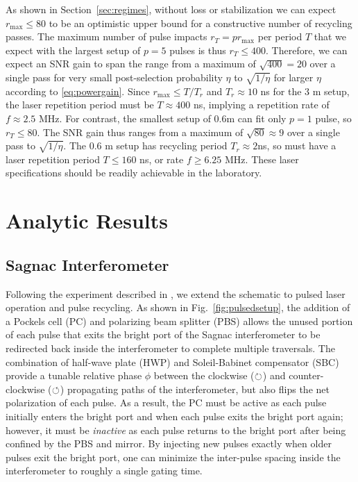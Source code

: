 As shown in Section~\ref{sec:regimes}, without loss or stabilization we can expect $r_{\text{max}} \leq 80$ to be an optimistic upper bound for a constructive number of recycling passes.  The maximum number of pulse impacts $r_T = p r_{\text{max}}$ per period $T$ that we expect with the largest setup of $p=5$ pulses is thus $r_T \leq 400$.  Therefore, we can expect an SNR gain to span the range from a maximum of $\sqrt{400}=20$ over a single pass for very small post-selection probability $\eta$ to $\sqrt{1/\eta}$ for larger $\eta$ according to \eqref{eq:powergain}.  Since $r_{\text{max}} \le T / T_r$ and $T_r \approx 10$ ns for the $3$ m setup, the laser repetition period must be $T \approx 400$ ns, implying a repetition rate of $f \approx 2.5$ MHz.  For contrast, the smallest setup of $0.6$m can fit only $p = 1$ pulse, so $r_T \leq 80$.  The SNR gain thus ranges from a maximum of $\sqrt{80}\approx9$ over a single pass to $\sqrt{1/\eta}$.  The $0.6$ m setup has recycling period $T_r \approx 2$ns, so must have a laser repetition period $T \leq 160$ ns, or rate $f \geq 6.25$ MHz.  These laser specifications should be readily achievable in the laboratory.

\section{Analytic Results}\label{sec:collimated}
\subsection{Sagnac Interferometer}
Following the experiment described in \cite{Dixon2009,Starling2009,Howell2010}, we extend the schematic to pulsed laser operation and pulse recycling.  As shown in Fig.~\ref{fig:pulsedsetup}, the addition of a Pockels cell (PC) and polarizing beam splitter (PBS) allows the unused portion of each pulse that exits the bright port of the Sagnac interferometer to be redirected back inside the interferometer to complete multiple traversals.  The combination of half-wave plate (HWP) and Soleil-Babinet compensator (SBC) provide a tunable relative phase $\phi$ between the clockwise ($\circlearrowright$) and counter-clockwise ($\circlearrowleft$) propagating paths of the interferometer, but also flips the net polarization of each pulse.  As a result, the PC must be active as each pulse initially enters the bright port and when each pulse exits the bright port again; however, it must be \emph{inactive} as each pulse returns to the bright port after being confined by the PBS and mirror.  By injecting new pulses exactly when older pulses exit the bright port, one can minimize the inter-pulse spacing inside the interferometer to roughly a single gating time.

